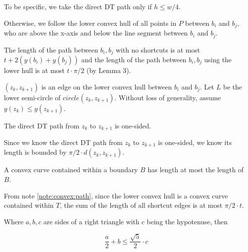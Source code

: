 \documentclass{tufte-handout}
\begin{document}
To be specific, we take the direct DT path only if $h \le w/4$.

Otherwise, we follow the lower convex hull of all points in $P$
between $b_i$ and $b_j$, who are above the x-axis and below the line
segment between $b_i$ and $b_j$.

The length of the path between $b_i,b_j$ with no shortcuts is at most
$t + 2(y(b_i) + y(b_j))$ and the length of the path between $b_i,b_j$
using the lower hull is at most $t \cdot \pi /2$ (by Lemma 3).


$(z_k,z_{k+1})$ is an edge on the lower convex hull between $b_i$ and
$b_j$.  Let $L$ be the lower semi-circle of $circle(z_k, z_{k+1})$.
Without loss of generality, assume $y(z_k) \le y(z_{k+1})$.

\begin{Lemma}

  \label{lemma:convex:path:one:sided}

  The direct DT path from $z_k$ to $z_{k+1}$ is one-sided.
  
\end{Lemma}

Since we know the direct DT path from $z_k$ to $z_{k+1}$ is one-sided,
we know its length is bounded by $\pi/2 \cdot d(z_k,z_{k+1})$.

\begin{Note}
  \label{note:convex:path}

  A convex curve contained within a boundary $B$ has length at most
  the length of $B$. \cite{Benson:1966} %


\end{Note}

From note \ref{note:convex:path}, since the lower convex hull is a
convex curve contained within $T$, the sum of the length of all
shortcut edges is at most $\pi/2 \cdot t$.

\begin{Note}
  \label{note:right:triangle}

  Where $a,b,c$ are sides of a right triangle with $c$ being the
  hypotenuse, then

  \begin{displaymath}
    \frac{a}{2} + b \le \frac{\sqrt{5}}{2} \cdot c
  \end{displaymath}
  
\end{Note}
\end{document}
